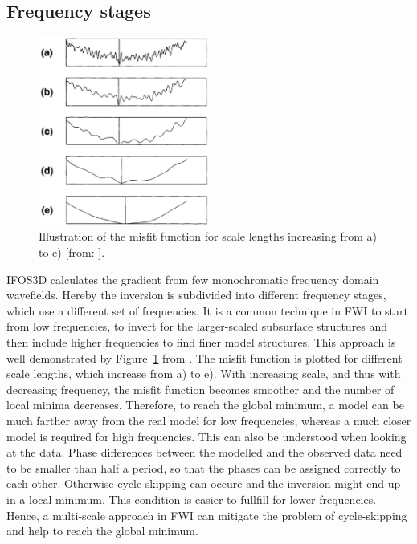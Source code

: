 \subsection{Frequency stages}
\begin{figure}[h!]
\begin{center}
\includegraphics[width=0.5\textwidth]{fig/misfit_bunks}
\caption[Misfit at different scale lengths (from \cite{Bun95})]{Illustration of the misfit function for scale lengths increasing from a) to e) [from: \cite{Bun95}].}\label{fig:bunks}
\end{center}
\end{figure}
IFOS3D calculates the gradient from few monochromatic frequency domain wavefields. Hereby the inversion is subdivided into different frequency stages, which use a different set of frequencies. It is a common technique in FWI to start from low frequencies, to invert for the larger-scaled subsurface structures and then include higher frequencies to find finer model structures. This approach is well demonstrated by Figure~\ref{fig:bunks} from \citep{Bun95}. The misfit function is plotted for different scale lengths, which increase from a) to e). With increasing scale, and thus with decreasing frequency, the misfit function becomes smoother and the number of local minima decreases. Therefore, to reach the global minimum, a model can be much farther away from the real model for low frequencies, whereas a much closer model is required for high frequencies. This can also be understood when looking at the data. Phase differences between the modelled and the observed data need to be smaller than half a period, so that the phases can be assigned correctly to each other. Otherwise cycle skipping can occure and the inversion might end up in a local minimum. This condition is easier to fullfill for lower frequencies. Hence, a multi-scale approach in FWI can mitigate the problem of cycle-skipping and help to reach the global minimum.
